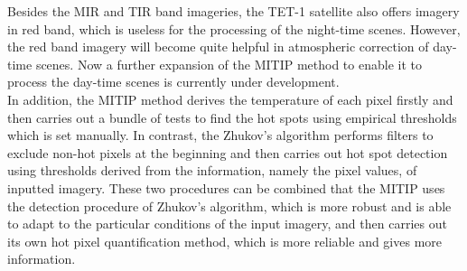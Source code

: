 \noindent Besides the MIR and TIR band imageries, the TET-1 satellite also offers imagery in red band, which is useless for the processing of the night-time scenes. However, the red band imagery will become quite helpful in atmospheric correction of day-time scenes. Now a further expansion of the MITIP method to enable it to process the day-time scenes is currently under development.\\

\noindent In addition, the MITIP method derives the temperature of each pixel firstly and then carries out a bundle of tests to find the hot spots using empirical thresholds which is set manually. In contrast, the Zhukov's algorithm performs filters to exclude non-hot pixels at the beginning and then carries out hot spot detection using thresholds derived from the information, namely the pixel values, of inputted imagery. These two procedures can be combined that the MITIP uses the detection procedure of Zhukov's algorithm, which is more robust and is able to adapt to the particular conditions of the input imagery, and then carries out its own hot pixel quantification method, which is more reliable and gives more information.\\